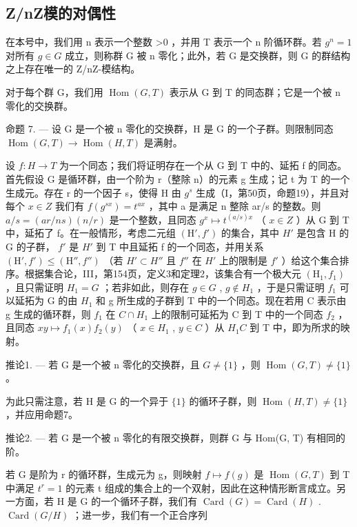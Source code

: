 \subsection{Z/nZ模的对偶性}

在本号中，我们用 n 表示一个整数 \textgreater0 ，并用 T 表示一个 n 阶循环群。若 \(g^{n}=1\) 对所有 \(g\in G\) 成立，则称群 G 被 n 零化；此外，若 G 是交换群，则 G 的群结构之上存在唯一的 Z/nZ-模结构。

对于每个群 G，我们用 \(\operatorname{Hom}(G, T)\) 表示从 G 到 T 的同态群；它是一个被 n 零化的交换群。

命题 7. --- 设 G 是一个被 n 零化的交换群，H 是 G 的一个子群。则限制同态 \(\operatorname{Hom}(G, T) \to \operatorname{Hom}(H, T)\) 是满射。

设 \(f:H\to T\) 为一个同态；我们将证明存在一个从 G 到 T 中的、延拓 f 的同态。首先假设 G 是循环群，由一个阶为 r（整除 n）的元素 g 生成；记 t 为 T 的一个生成元。存在 r 的一个因子 s，使得 H 由 \(g^{s}\) 生成（I，第50页，命题19），并且对每个 \(x \in Z\) 我们有 \(f(g^{sx}) = t^{ax}\) ，其中 a 是满足 n 整除 ar/s 的整数。则 \(a/s = (ar/ns)(n/r)\) 是一个整数，且同态 \(g^{x} \mapsto t^{(a/s)x}\) （ \(x \in Z\) ）从 G 到 T 中，延拓了 f。在一般情形，考虑二元组 \((\mathrm{H}', f')\) 的集合，其中 \(H'\) 是包含 H 的 G 的子群， \(f'\) 是 \(H'\) 到 T 中且延拓 f 的一个同态，并用关系 \((\mathrm{H}', f') \leqslant (\mathrm{H}'', f'')\) （若 \(H' \subset H''\) 且 \(f''\) 在 \(H'\) 上的限制是 \(f'\) ）给这个集合排序。根据集合论，III，第154页，定义3和定理2，该集合有一个极大元 \((\mathrm{H}_{1}, f_{1})\) ，且只需证明 \(H_{1} = G\) ；若非如此，则存在 \(g \in G\) , \(g \notin H_{1}\) ，于是只需证明 \(f_{1}\) 可以延拓为 G 的由 \(H_{1}\) 和 g 所生成的子群到 T 中的一个同态。现在若用 C 表示由 g 生成的循环群，则 \(f_{1}\) 在 \(C \cap H_{1}\) 上的限制可延拓为 C 到 T 中的一个同态 \(f_{2}\) ，且同态 \(xy \mapsto f_{1}(x) f_{2}(y)\) （ \(x \in H_{1}\) , \(y \in C\) ）从 \(H_{1}C\) 到 T 中，即为所求的映射。

推论1. --- 若 G 是一个被 n 零化的交换群，且 \(G \neq \{1\}\) ，则 \(\operatorname{Hom}(G, T) \neq \{1\}\) 。

为此只需注意，若 H 是 G 的一个异于 \(\{1\}\) 的循环子群，则 \(\operatorname{Hom}(H, T) \neq \{1\}\) ，并应用命题7。

推论2. --- 若 G 是一个被 n 零化的有限交换群，则群 G 与 Hom(G, T) 有相同的阶。

若 G 是阶为 r 的循环群，生成元为 g，则映射 \(f \mapsto f(g)\) 是 \(\operatorname{Hom}(G, T)\) 到 T 中满足 \(t^{r} = 1\) 的元素 t 组成的集合上的一个双射，因此在这种情形断言成立。另一方面，若 H 是 G 的一个循环子群，我们有 \(\operatorname{Card}(G) = \operatorname{Card}(H)\) . \(\operatorname{Card}(G/H)\) ；进一步，我们有一个正合序列

